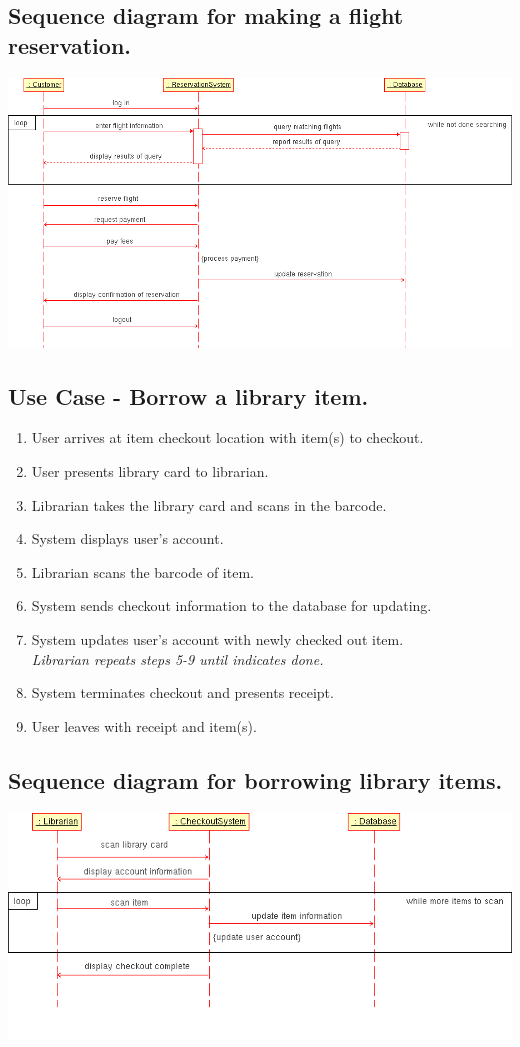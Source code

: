 \documentclass{article}[12pt]
\begin{document}
  \subsection*{Sequence diagram for making a flight reservation.}
    \includegraphics[scale=0.45]{make_reservation.png}

  \subsection*{Use Case - Borrow a library item.}
    \begin{enumerate}
      \item User arrives at item checkout location with item(s) to checkout.
      \item User presents library card to librarian.
      \item Librarian takes the library card and scans in the barcode.
      \item System displays user's account.
      \item Librarian scans the barcode of item.
      \item System sends checkout information to the database for updating. 
      \item System updates user's account with newly checked out item. \\
            \emph{Librarian repeats steps 5-9 until indicates done.}
      \item System terminates checkout and presents receipt.
      \item User leaves with receipt and item(s).
    \end{enumerate} 

  \subsection*{Sequence diagram for borrowing library items.}
    \includegraphics[scale=0.45]{checkout_item.png}
\end{document}
